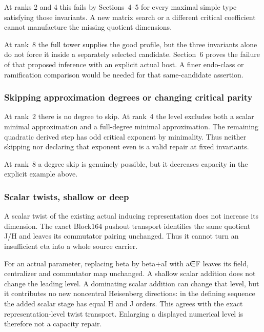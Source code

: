At ranks 2 and 4 this fails by Sections~4--5 for every maximal simple type
satisfying those invariants. A new matrix search or a different critical
coefficient cannot manufacture the missing quotient dimensions.

At rank~8 the full tower supplies the good profile, but the three
invariants alone do not force it inside a separately selected candidate.
Section~6 proves the failure of that proposed inference with an explicit
actual host. A finer endo-class or ramification comparison would be
needed for that same-candidate assertion.

\hypertarget{dyadic_capacity-skipping-approximation-degrees-or-changing-critical-parity}{%
\subsubsection{Skipping approximation degrees or changing critical
parity}\label{dyadic_capacity-skipping-approximation-degrees-or-changing-critical-parity}}

At rank~2 there is no degree to skip. At rank~4 the level excludes both a
scalar minimal approximation and a full-degree minimal approximation.
The remaining quadratic derived step has odd critical exponent by
minimality. Thus neither skipping nor declaring that exponent even is a
valid repair at fixed invariants.

At rank~8 a degree skip is genuinely possible, but it decreases capacity
in the explicit example above.

\hypertarget{dyadic_capacity-scalar-twists-shallow-or-deep}{%
\subsubsection{Scalar twists, shallow or
deep}\label{dyadic_capacity-scalar-twists-shallow-or-deep}}

A scalar twist of the existing actual inducing representation does not
increase its dimension. The exact Block164 pushout transport identifies
the same quotient J/H and leaves its commutator pairing unchanged. Thus
it cannot turn an insufficient eta into a whole source carrier.

For an actual parameter, replacing beta by beta+aI with a∈F leaves its
field, centralizer and commutator map unchanged. A shallow scalar
addition does not change the leading level. A dominating scalar addition
can change that level, but it contributes no new noncentral Heisenberg
directions: in the defining sequence the added scalar stage has equal H
and J orders. This agrees with the exact representation-level twist
transport. Enlarging a displayed numerical level is therefore not a
capacity repair.

